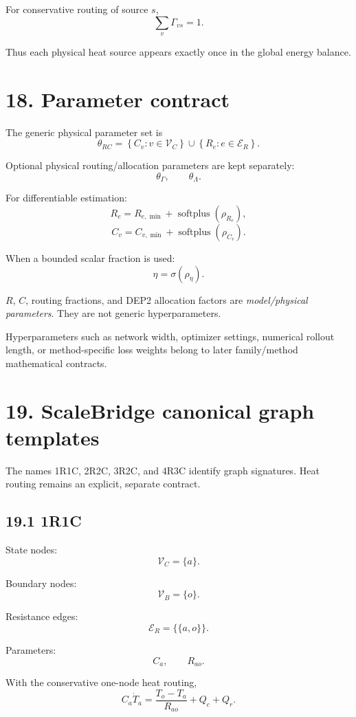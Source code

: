 \documentclass[11pt]{article}
\newcommand{\Vc}{\mathcal{V}_{C}}
\newcommand{\Vb}{\mathcal{V}_{B}}
\newcommand{\Er}{\mathcal{E}_{R}}
\begin{document}
For conservative routing of source $s$,
\[
\sum_v\Gamma_{vs}=1.
\]

Thus each physical heat source appears exactly once in the global
energy balance.

\section*{18. Parameter contract}

The generic physical parameter set is
\[
\boxed{
\theta_{RC}
=
\left\{
C_v:v\in\Vc
\right\}
\cup
\left\{
R_e:e\in\Er
\right\}.
}
\]

Optional physical routing/allocation parameters are kept separately:
\[
\theta_{\Gamma},
\qquad
\theta_{\Lambda}.
\]

For differentiable estimation:
\[
\boxed{
R_e
=
R_{e,\min}
+
\operatorname{softplus}(\rho_{R_e}),
}
\tag{E0.3-20}
\]
\[
\boxed{
C_v
=
C_{v,\min}
+
\operatorname{softplus}(\rho_{C_v}).
}
\tag{E0.3-21}
\]

When a bounded scalar fraction is used:
\[
\boxed{
\eta=\sigma(\rho_\eta).
}
\tag{E0.3-22}
\]

$R$, $C$, routing fractions, and DEP2 allocation factors are
\emph{model/physical parameters}.  They are not generic hyperparameters.

Hyperparameters such as network width, optimizer settings, numerical rollout
length, or method-specific loss weights belong to later family/method
mathematical contracts.

\section*{19. ScaleBridge canonical graph templates}

The names 1R1C, 2R2C, 3R2C, and 4R3C identify graph signatures.
Heat routing remains an explicit, separate contract.

\subsection*{19.1 1R1C}

State nodes:
\[
\Vc=\{a\}.
\]

Boundary nodes:
\[
\Vb=\{o\}.
\]

Resistance edges:
\[
\Er=\{\{a,o\}\}.
\]

Parameters:
\[
C_a,\qquad R_{ao}.
\]

With the conservative one-node heat routing,
\[
\boxed{
C_a\dot T_a
=
\frac{T_o-T_a}{R_{ao}}
+
Q_c+Q_r.
}
\tag{E0.3-23}
\]
\end{document}
